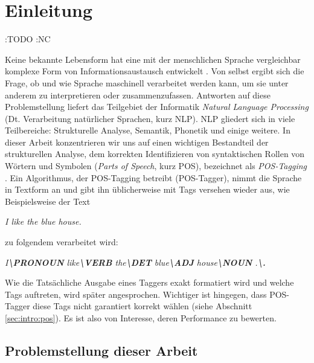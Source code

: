 %
\chapter{Einleitung}
\label{sec:intro}


:TODO :NC

Keine bekannte Lebensform hat eine mit der menschlichen Sprache vergleichbar komplexe Form von Informationsaustausch entwickelt \cite{Rao}. Von selbst ergibt sich die Frage, ob und wie Sprache maschinell verarbeitet werden kann, um sie unter anderem zu interpretieren oder zusammenzufassen. Antworten auf diese Problemstellung liefert das Teilgebiet der Informatik \textit{Natural Language Processing} (Dt. Verarbeitung natürlicher Sprachen, kurz NLP). NLP gliedert sich in viele Teilbereiche: Strukturelle Analyse, Semantik, Phonetik und einige weitere. In dieser Arbeit konzentrieren wir uns auf einen wichtigen Bestandteil der strukturellen Analyse, dem korrekten Identifizieren von syntaktischen Rollen von Wörtern und Symbolen (\textit{Parts of Speech}, kurz POS), bezeichnet als \textit{POS-Tagging} \cite{Smith}.
\newline
Ein Algorithmus, der POS-Tagging betreibt (POS-Tagger), nimmt die Sprache in Textform an und gibt ihn üblicherweise mit Tags versehen wieder aus, wie Beispielsweise der Text
\newline \newline
\centerline{\textit{I like the blue house.}}
	
 zu folgendem verarbeitet wird:
\newline \newline
\centerline{\textit{I\textbf{\textbackslash PRONOUN} like\textbf{\textbackslash VERB} the\textbf{\textbackslash DET} blue\textbf{\textbackslash ADJ} house\textbf{\textbackslash NOUN} .\textbf{\textbackslash .}}}

Wie die Tatsächliche Ausgabe eines Taggers exakt formatiert wird und welche Tags auftreten, wird später angesprochen. Wichtiger ist hingegen, dass POS-Tagger diese Tags nicht garantiert korrekt wählen (siehe Abschnitt \ref{sec:intro:pos}). Es ist also von Interesse, deren Performance zu bewerten.


\section{Problemstellung dieser Arbeit}
\label{sec:intro:task}

